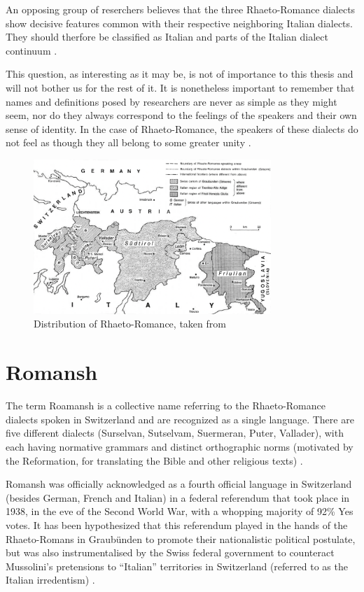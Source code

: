 An opposing group of reserchers believes that the three Rhaeto-Romance dialects show decisive  features common with their respective neighboring Italian dialects. 
They should therfore be classified as Italian and parts of the Italian dialect continuum \autocite[174]{bossong2008}.

This question, as interesting as it may be, is not of importance to this thesis and will not bother us for the rest of it.
It is nonetheless important to remember that names and definitions posed by researchers are never as simple as they might seem, nor do they always correspond to the feelings of the speakers and their own sense of identity. 
In the case of Rhaeto-Romance, the speakers of these dialects do not feel as though they all belong to some greater unity \autocite[175]{bossong2008}.

\begin{figure}
\centering
\includegraphics[width=0.8\textwidth]{graphics/raeto-map.png}
\caption{Distribution of Rhaeto-Romance, taken from \cite[2]{haiman1992}}
\label{fig:raeto-map}
\end{figure}

\section{Romansh}
The term Roamansh is a collective name referring to the Rhaeto-Romance dialects spoken in Switzerland and are recognized as a single language. 
There are five different dialects (Surselvan, Sutselvam, Suermeran, Puter, Vallader), with each having normative grammars and distinct orthographic norms (motivated by the Reformation, for translating the Bible and other religious texts) \autocites[1]{haiman1992}[178]{bossong2008}.

Romansh was officially acknowledged as a fourth official language in Switzerland (besides German, French and Italian) in a federal referendum that took place in 1938, in the eve of the Second World War, with a whopping majority of 92\% Yes votes. 
It has been hypothesized that this referendum played in the hands of the Rhaeto-Romans in Graubünden to promote their nationalistic political postulate, but was also instrumentalised by the Swiss federal government to counteract Mussolini's pretensions to \enquote{Italian} territories in Switzerland (referred to as the Italian irredentism) \autocite{valaer2012}.

